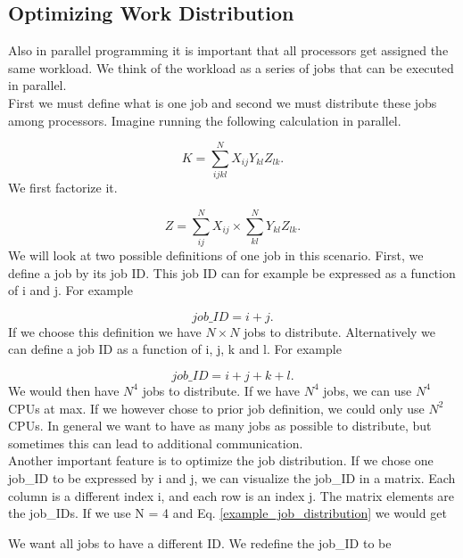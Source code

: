 \documentclass[a4paper,norsk,11pt,twoside]{report}
\begin{document}
\subsection{Optimizing Work Distribution \label{work_dist_section_1341}}
Also in parallel programming it is important that all processors get assigned the same workload. We think of the workload as a series of jobs that can be executed in parallel. \\

First we must define what is one job and second we must distribute these jobs among processors. Imagine running the following calculation in parallel.

\begin{equation}
K = \sum_{ijkl}^N X_{ij} Y_{kl} Z_{lk} .
\end{equation}
We first factorize it.

\begin{equation}
Z = \sum_{ij}^N X_{ij} \times \sum_{kl}^N Y_{kl} Z_{lk} .
\end{equation}
We will look at two possible definitions of one job in this scenario. First, we define a job by its job ID. This job ID can for example be expressed as a function of i and j. For example

\begin{equation}
job\_ID = i + j . \label{example_job_distribution}
\end{equation}
If we choose this definition we have $N \times N$ jobs to distribute. Alternatively we can define a job ID as a function of i, j, k and l. For example

\begin{equation}
job\_ID = i + j + k + l .
\end{equation}
We would then have $N^4$ jobs to distribute. If we have $N^4$ jobs, we can  use $N^4$ CPUs at max. If we however chose to prior job definition, we could only use $N^2$ CPUs. In general we want to have as many jobs as possible to distribute, but sometimes this can lead to additional communication. \\

Another important feature is to optimize the job distribution. If we chose one job\_ID to be expressed by i and j, we can visualize the job\_ID in a matrix. Each column is a different index i, and each row is an index j. The matrix elements are the job\_IDs. If we use N = 4 and Eq. \eqref{example_job_distribution} we would get

\begin{center}
\end{center}
We want all jobs to have a different ID. We redefine the job\_ID to be
\end{document}
